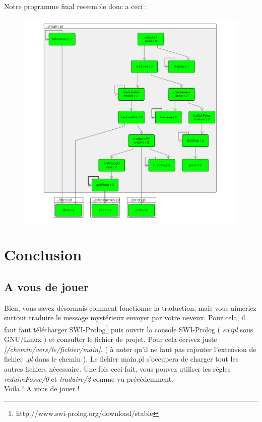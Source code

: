 \documentclass[11pt]{book}
\begin{document}
	Notre programme final ressemble donc a ceci :\\
	\begin{figure}[htp]
	\centering
	\includegraphics[scale=0.60]{mainpl.png}
	\end{figure}
 
\chapter{Conclusion}
	\section{A vous de jouer}
	Bien, vous savez désormais comment fonctionne la traduction, mais vous aimeriez surtout traduire le message mystérieux envoyer par votre neveux. Pour cela, il faut faut télécharger SWI-Prolog\footnote{http://www.swi-prolog.org/download/stable} puis ouvrir la console SWI-Prolog ( {\em swipl} sous GNU/Linux ) et consulter le fichier de projet. Pour cela écrivez juste {\em [/chemin/vers/le/fichier/main].} ( à noter qu'il ne faut pas rajouter l'extension de fichier {\em .pl} dans le chemin ). Le fichier main.pl s'occupera de charger tout les autres fichiers nécessaire. Une fois ceci fait, vous pouvez utiliser les règles {\em reduireFosse/0} et {\em traduire/2} comme vu précédemment.\\
	Voila ! A vous de jouer !
	
\end{document}

